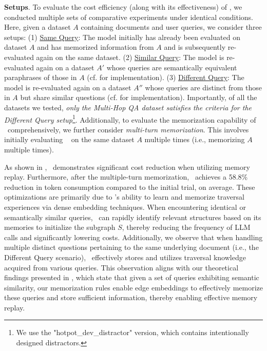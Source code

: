 \textbf{Setups}. To evaluate the cost efficiency (along with its effectiveness) of \ours, we conducted multiple sets of comparative experiments under identical conditions. Here, given a dataset $A$ containing documents and user queries, we consider three setups: (1) \uline{Same Query}: The model initially has already been evaluated on dataset $A$ and has memorized information from $A$ and is subsequently re-evaluated again on the same dataset. (2) \uline{Similar Query}: The model is re-evaluated again on a dataset $A'$ whose queries are semantically equivalent paraphrases of those in $A$ (cf.  for implementation). (3) \uline{Different Query}: The model is re-evaluated again on a dataset $A''$ whose queries are distinct from those in $A$ but share similar questions (cf.  for implementation). Importantly, of all the datasets we tested, \textit{only the Multi-Hop QA dataset satisfies the criteria for the Different Query setup}\footnote{We use the "hotpot\_dev\_distractor" version, which contains intentionally designed distractors.}. Additionally, to evaluate the memorization capability of \ours~comprehensively, we further consider \textit{multi-turn memorization}. This involves initially evaluating \ours~ on the same dataset $A$ multiple times (i.e., memorizing $A$ multiple times). 

As shown in , \ours~demonstrates significant cost reduction when utilizing memory replay. Furthermore, after the multiple-turn memorization, \ours~achieves a 58.8\% reduction in token consumption compared to the initial trial, on average. These optimizations are primarily due to \ours's ability to learn and memorize traversal experiences via dense embedding techniques. When encountering identical or semantically similar queries, \ours~can rapidly identify relevant structures based on its memories to initialize the subgraph $S$, thereby reducing the frequency of LLM calls and significantly lowering costs. Additionally, we observe that when handling multiple distinct questions pertaining to the same underlying document (i.e., the Different Query scenario), \ours~effectively stores and utilizes traversal knowledge acquired from various queries. This observation aligns with our theoretical findings presented in , which state that given a set of queries exhibiting semantic similarity, our memorization rules enable edge embeddings to effectively memorize these queries and store sufficient information, thereby enabling effective memory replay.


